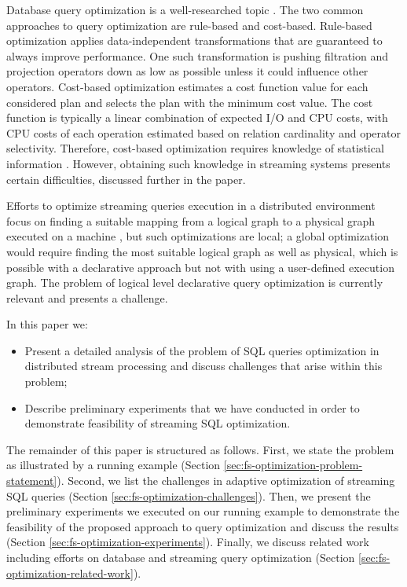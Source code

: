 Database query optimization is a well-researched topic \cite{astrahan1976system, haas1989extensible, graefe1993volcano}. 
The two common approaches to query optimization are rule-based and cost-based. Rule-based optimization applies data-independent transformations that are guaranteed to always improve performance. One such transformation is pushing filtration and projection operators down as low as possible unless it could influence other operators. Cost-based optimization estimates a cost function value for each considered plan and selects the plan with the minimum cost value. The cost function is typically a linear combination of expected I/O and CPU costs, with CPU costs of each operation estimated based on relation cardinality and operator selectivity. Therefore, cost-based optimization requires knowledge of statistical information \cite{Neumann2018optimization}. However, obtaining such knowledge in streaming systems presents certain difficulties, discussed further in the paper.

Efforts to optimize streaming queries execution in a distributed environment focus on finding a suitable mapping from a logical graph to a physical graph executed on a machine \cite{grulich2020grizzly, gedik2009code, kroll2019arc, schneider2012auto, gedik2008spade}, but such optimizations are local; a global optimization would require finding the most suitable logical graph as well as physical, which is possible with a declarative approach but not with using a user-defined execution graph. The problem of logical level declarative query optimization is currently relevant and presents a challenge.


In this paper we:
\begin{itemize}
    \item Present a detailed analysis of the problem of SQL queries optimization in distributed stream processing and discuss challenges that arise within this problem;
    \item Describe preliminary experiments that we have conducted in order to demonstrate feasibility of streaming SQL optimization.
\end{itemize}

The remainder of this paper is structured as follows. First, we state the problem as illustrated by a running example (Section \ref{sec:fs-optimization-problem-statement}). Second, we list the challenges in adaptive optimization of streaming SQL queries (Section \ref{sec:fs-optimization-challenges}). Then, we present the preliminary experiments we executed on our running example to demonstrate the feasibility of the proposed approach to query optimization and discuss the results (Section \ref{sec:fs-optimization-experiments}). Finally, we discuss related work including efforts on database and streaming query optimization (Section \ref{sec:fs-optimization-related-work}).     
